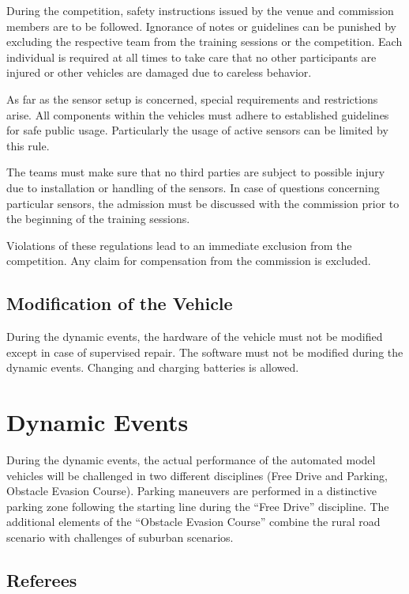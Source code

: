 \documentclass[a4paper]{report}
\begin{document}
During the competition, safety instructions issued by the venue and commission
members are to be followed. Ignorance of notes or guidelines can be punished by
excluding the respective team from the training sessions or the competition.
Each individual is required at all times to take care that no other
participants are injured or other vehicles are damaged due to careless
behavior.

As far as the sensor setup is concerned, special requirements and restrictions
arise. All components within the vehicles must adhere to established guidelines
for safe public usage. Particularly the usage of active sensors can be limited
by this rule.

The teams must make sure that no third parties are subject to possible injury
due to installation or handling of the sensors. In case of questions concerning
particular sensors, the admission must be discussed with the commission prior
to the beginning of the training sessions.

Violations of these regulations lead to an immediate exclusion from the
competition. Any claim for compensation from the commission is excluded.

\section{Modification of the Vehicle}

During the dynamic events, the hardware of the vehicle must not be modified
except in case of supervised repair. The software must not be modified during
the dynamic events. Changing and charging batteries is allowed.

\chapter{Dynamic Events}

During the dynamic events, the actual performance of the automated model
vehicles will be challenged in two different disciplines (Free Drive and
Parking, Obstacle Evasion Course). Parking maneuvers are performed in a
distinctive parking zone following the starting line during the “Free Drive”
discipline. The additional elements of the “Obstacle Evasion Course” combine
the rural road scenario with challenges of suburban scenarios.

\section{Referees}
\end{document}
